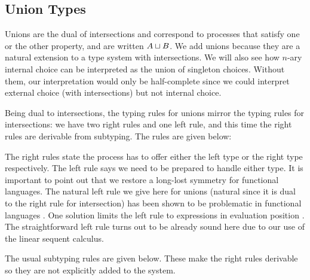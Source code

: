 \documentclass[submission,copyright,creativecommons]{eptcs}
\begin{document}
\subsection{Union Types}

Unions are the dual of intersections and correspond to processes that satisfy one or the other property, and are written $A \mathbin{\sqcup} B$. We add unions because they are a natural extension to a  type system with intersections. We will also see how $n$-ary internal choice can be interpreted as
the union of singleton choices. Without them, our interpretation would only be half-complete since we could interpret external choice (with intersections) but not internal choice.

Being dual to intersections, the typing rules for unions mirror the typing rules for intersections: we have two right rules and one left rule, and this time the right rules are derivable from subtyping. The rules are given below:


The right rules state the process has to offer either the left type or the right type respectively. The left rule says we need to be prepared to handle either type. It is important to point out that we restore a long-lost symmetry for functional languages. The natural left rule we give here for unions (natural since it is dual to the right rule for intersection) has been shown to be problematic in functional languages \cite{Barbanera95ic}. One solution limits the left rule to expressions in evaluation position \cite{DunfieldP04}. The straightforward left rule turns out to be already sound here due to our use of the linear sequent calculus.

The usual subtyping rules are given below. These make the right rules derivable so they are not explicitly added to the system.

\end{document}
